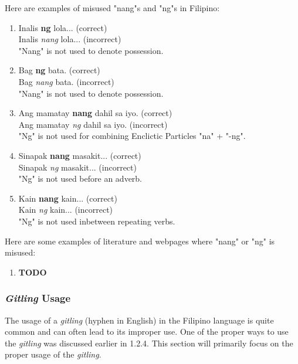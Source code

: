 \begin{example}
      Here are examples of misused "nang"s and "ng"s in Filipino:
\end{example}
\begin{enumerate}
      \item Inalis \textbf{ng} lola... (correct) \\
            Inalis \textit{nang} lola... (incorrect) \\
            "Nang" is not used to denote possession.
      \item Bag \textbf{ng} bata. (correct) \\
            Bag \textit{nang} bata. (incorrect) \\
            "Nang" is not used to denote possession.
      \item Ang mamatay \textbf{nang} dahil sa iyo. (correct) \\
            Ang mamatay \textit{ng} dahil sa iyo. (incorrect) \\
            "Ng" is not used for combining Enclictic Particles "na" + "-ng".
      \item Sinapak \textbf{nang} masakit... (correct) \\
            Sinapak \textit{ng} masakit... (incorrect) \\
            "Ng" is not used before an adverb.
      \item Kain \textbf{nang} kain... (correct) \\
            Kain \textit{ng} kain... (incorrect) \\
            "Ng" is not used inbetween repeating verbs.
\end{enumerate}

\begin{example}
      Here are some examples of literature and webpages where "nang" or "ng" is
      misused:
\end{example}
\begin{enumerate}
      \item \textbf{TODO}
\end{enumerate}

\subsubsection{\textit{Gitling} Usage}
The usage of a \textit{\textit{gitling}} (hyphen in English) in the Filipino language is quite common and can often lead to its improper use. One of the proper ways to use the \textit{\textit{gitling}} was discussed earlier in 1.2.4. This section will primarily focus on the proper usage of the \textit{\textit{gitling}}.

